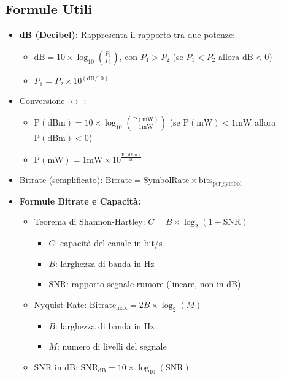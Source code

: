 \subsection{Formule Utili}
\begin{itemize}
    \item \textbf{dB (Decibel):} Rappresenta il rapporto tra due potenze:
    \begin{itemize}
        \item $\text{dB} = 10 \times \log_{10}( \frac{P_1}{P_2} )$, con $P_1 > P_2$ (se $P_1 < P_2$ allora $\text{dB} < 0$)
        \item $P_1 = P_2 \times 10^{( \text{dB} / 10 )}$
    \end{itemize}
    \item Conversione  $\leftrightarrow$ :
    \begin{itemize}
        \item $\text{P}(\text{dBm}) = 10 \times \log_{10}\left(\frac{\text{P}(\text{mW})}{1\text{mW}}\right)$ (se $\text{P}(\text{mW}) < 1\text{mW}$ allora $\text{P}(\text{dBm}) < 0$)
        \item $\text{P}(\text{mW}) = 1\text{mW} \times 10^{\frac{\text{P}(\text{dBm})}{10}}$
    \end{itemize}
    \item Bitrate (semplificato): $\text{Bitrate} = \text{SymbolRate} \times \text{bits}_{\text{per\_symbol}}$
    \item \textbf{Formule Bitrate e Capacità:}
    \begin{itemize}
        \item Teorema di Shannon-Hartley: $C = B \times \log_2(1 + \text{SNR})$
        \begin{itemize}
            \item $C$: capacità del canale in bit/s
            \item $B$: larghezza di banda in Hz
            \item $\text{SNR}$: rapporto segnale-rumore (lineare, non in dB)
        \end{itemize}
        \item Nyquist Rate: $\text{Bitrate}_{\text{max}} = 2B \times \log_2(M)$
        \begin{itemize}
            \item $B$: larghezza di banda in Hz
            \item $M$: numero di livelli del segnale
        \end{itemize}
        \item SNR in dB: $\text{SNR}_{\text{dB}} = 10 \times \log_{10}(\text{SNR})$

\end{itemize}
\end{itemize}
